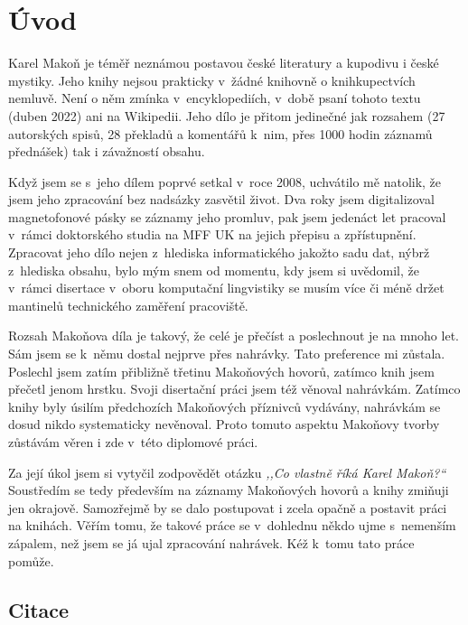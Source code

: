 \chapter{Úvod}
\label{kap:uvod}

Karel Makoň je téměř neznámou postavou české literatury a kupodivu i české
mystiky. Jeho knihy nejsou prakticky v~žádné knihovně o knihkupectvích nemluvě.
Není o něm zmínka v~encyklopediích, v~době psaní tohoto textu (duben 2022) ani
na Wikipedii. Jeho dílo je přitom jedinečné jak rozsahem (27 autorských spisů,
28 překladů a komentářů k~nim, přes 1000 hodin záznamů přednášek) tak i
závažností obsahu.

Když jsem se s~jeho dílem poprvé setkal v~roce 2008, uchvátilo mě natolik, že
jsem jeho zpracování bez nadsázky zasvětil život. Dva roky jsem digitalizoval
magnetofonové pásky se záznamy jeho promluv, pak jsem jedenáct let pracoval
v~rámci doktorského studia na MFF UK na jejich přepisu a zpřístupnění. Zpracovat
jeho dílo nejen z~hlediska informatického jakožto sadu dat, nýbrž z~hlediska
obsahu, bylo mým snem od momentu, kdy jsem si uvědomil, že v~rámci disertace
v~oboru komputační lingvistiky se musím více či méně držet mantinelů technického
zaměření pracoviště.

Rozsah Makoňova díla je takový, že celé je přečíst a poslechnout je na mnoho
let. Sám jsem se k~němu dostal nejprve přes nahrávky. Tato preference mi
zůstala. Poslechl jsem zatím přibližně třetinu Makoňových hovorů, zatímco knih
jsem přečetl jenom hrstku. Svoji disertační práci jsem též věnoval nahrávkám. Zatímco
knihy byly úsilím předchozích Makoňových příznivců vydávány, nahrávkám se
dosud nikdo systematicky nevěnoval. Proto tomuto aspektu Makoňovy tvorby zůstávám věren i
zde v~této diplomové práci.

Za její úkol jsem si vytyčil zodpovědět otázku \textit{,,Co vlastně říká Karel
Makoň?{}``} Soustředím se tedy především na záznamy Makoňových hovorů a knihy
zmiňuji jen okrajově. Samozřejmě by se dalo postupovat i zcela opačně a postavit
práci na knihách. Věřím tomu, že takové práce se v~dohlednu někdo ujme s~nemenším
zápalem, než jsem se já ujal zpracování nahrávek. Kéž k~tomu tato práce pomůže.

\section{Citace}

